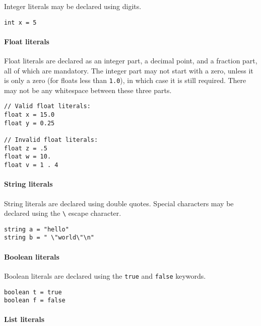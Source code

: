 \documentclass[]{article}
\begin{document}
Integer literals may be declared using digits.

\begin{verbatim}
int x = 5
\end{verbatim}

\paragraph{Float literals}\label{float-literals}

Float literals are declared as an integer part, a decimal point, and a
fraction part, all of which are mandatory. The integer part may not
start with a zero, unless it is only a zero (for floats less than
\texttt{1.0}), in which case it is still required. There may not be any
whitespace between these three parts.

\begin{verbatim}
// Valid float literals:
float x = 15.0
float y = 0.25

// Invalid float literals:
float z = .5
float w = 10.
float v = 1 . 4
\end{verbatim}

\paragraph{String literals}\label{string-literals}

String literals are declared using double quotes. Special characters may
be declared using the \texttt{\textbackslash{}} escape character.

\begin{verbatim}
string a = "hello"
string b = " \"world\"\n"
\end{verbatim}

\paragraph{Boolean literals}\label{boolean-literals}

Boolean literals are declared using the \texttt{true} and \texttt{false}
keywords.

\begin{verbatim}
boolean t = true
boolean f = false
\end{verbatim}

\paragraph{List literals}\label{list-literals}
\end{document}
